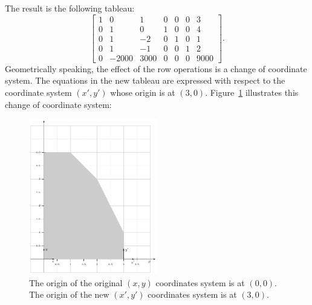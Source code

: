 \documentclass[11pt,oneside]{article}
\begin{document}
		\noindent
		The result is the following tableau:
		\[
			\left[
			\begin{array}{rrrrrr|r}
		1&     0&    1& 0& 0& 0&    3      \\ 
		0&     1&    0& 1& 0& 0&    4      \\ 
		0&     1&   -2& 0& 1& 0&    1      \\ 
		0&     1&   -1& 0& 0& 1&    2      \\ 
		0& -2000& 3000& 0& 0& 0& 9000      
			\end{array}
			\right].
		\]
		Geometrically speaking,
		the effect of the row operations is a change of coordinate system.
		The equations in the new tableau are expressed with respect to the 
		coordinate system $(x',y')$ whose origin is at $(3,0)$.
		Figure~\ref{fig:linear_programming_1} illustrates this change of coordinate system:
		
		\begin{figure}[htb]
		\begin{center}
		\includegraphics[width=0.5\textwidth]{figures/linear_algebra/linear_programming_2.pdf}
		\end{center}
		\vspace{-6mm}
		\caption{The origin of the original $(x,y)$ coordinates system is at $(0,0)$. 
				The origin of the new $(x',y')$ coordinates system is at $(3,0)$.}
		\label{fig:linear_programming_1}
		\end{figure}
\end{document}
